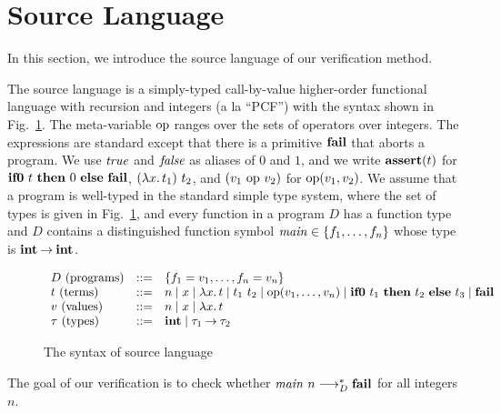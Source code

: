 \section{Source Language}
\label{sec:language}
In this section, we introduce the source language of our verification method.

The source language is a simply-typed call-by-value higher-order
functional language with recursion and integers (a la ``PCF'') with the
syntax shown in Fig.~\ref{fig:source-syntax}.
The meta-variable $\mathrm{op}$ ranges over the sets of operators over integers.
The expressions are standard except that there is a primitive $\mathbf{fail}$
that aborts a program.  We use $\mathit{true}$ and $\mathit{false}$ as aliases of $0$
and $1$, and we write $\mathbf{assert}({t})$ for $\mathbf{if0}~{t}~\mathbf{then}~{0}~\mathbf{else}~{\mathbf{fail}}$,
$(\lambda{x}.\,{t_1})\ t_2$, and $(v_1\ \mathrm{op}\ v_2)$ for $\mathrm{op}({v_1,v_2})$.  We
assume that a program is well-typed in the standard simple type system,
where the set of types is given in Fig.~\ref{fig:source-syntax}, and
every function in a program $D$ has a function type and $D$ contains a
distinguished function symbol $\mathit{main} \in \{{f_1,\dots,f_n}\}$ whose type
is ${\mathbf{int}}\mathbin{\rightarrow}{\mathbf{int}}$.

\begin{figure}[t]
\begin{minipage}{\widthcoef\textwidth}
\[
\begin{array}{lrl}
D\text{ (programs)} &::=& \{f_1 = v_1, \dots, f_n = v_n\} \\
t\text{ (terms)}
  &::=& n \mid x \mid \lambda{x}.\,{t} \mid t_1\ t_2 \mid \mathrm{op}({v_1,\dots,v_n}) \mid \mathbf{if0}~{t_1}~\mathbf{then}~{t_2}~\mathbf{else}~{t_3} \mid \mathbf{fail} \\
v\text{ (values)} &::=& n \mid x \mid \lambda{x}.\,{t} \\
\tau\text{ (types)} &::=& \mathbf{int} \mid {\tau_1}\mathbin{\rightarrow}{\tau_2} \\
\end{array}
\]
\end{minipage}
\caption{The syntax of source language}
\label{fig:source-syntax}
\end{figure}

The goal of our verification is to check whether ${\mathit{main}}~{n}
\longrightarrow^*_D \mathbf{fail}$ for all integers $n$.

